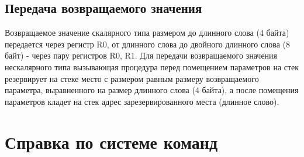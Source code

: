 \subsection{Передача возвращаемого значения}

    Возвращаемое значение скалярного типа размером до длинного слова (4 байта)
  передается через регистр R0, от длинного слова до двойного длинного слова
  (8 байт) - через пару регистров R0, R1. Для передачи возвращаемого значения
  нескалярного типа вызывающая процедура перед помещением параметров на стек
  резервирует на стеке место с размером равным размеру возвращаемого параметра,
  выравненного на размер длинного слова (4 байта), а после помещения параметров
  кладет на стек адрес зарезервированного места (длинное слово).

\section{Справка по системе команд}

